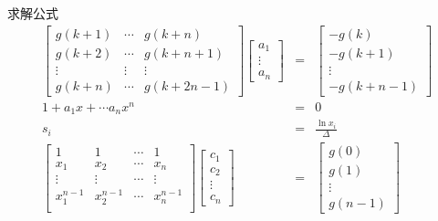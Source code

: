 \begin{frame}{求解公式}
\begin{eqnarray*}
\begin{bmatrix}
g(k+1) & \cdots & g(k+n) \\
g(k+2) & \cdots & g(k+n+1) \\
\vdots & \vdots & \vdots \\
g(k+n) & \cdots & g(k+2n-1)
\end{bmatrix}
\begin{bmatrix}
a_1 \\ \vdots \\ a_n
\end{bmatrix}
&=&
\begin{bmatrix}
-g(k) \\ -g(k+1) \\  \vdots \\  -g(k+n-1)
\end{bmatrix} \\
1+a_1 x + \cdots a_n x^n &=& 0  \\
s_i&=&\frac{\ln x_i}{\Delta}  \\
\begin{bmatrix}
1 & 1 & \cdots & 1 \\
x_1 & x_2 & \cdots & x_n \\
\vdots & \vdots & \cdots & \vdots \\
x_1^{n-1} & x_2^{n-1} & \cdots & x_n^{n-1} \\
\end{bmatrix}
\begin{bmatrix}
c_1 \\ c_2 \\  \vdots \\ c_n
\end{bmatrix}
&=&
\begin{bmatrix}
g(0) \\ g(1) \\  \vdots \\  g(n-1)
\end{bmatrix}
\end{eqnarray*}

\end{frame}



